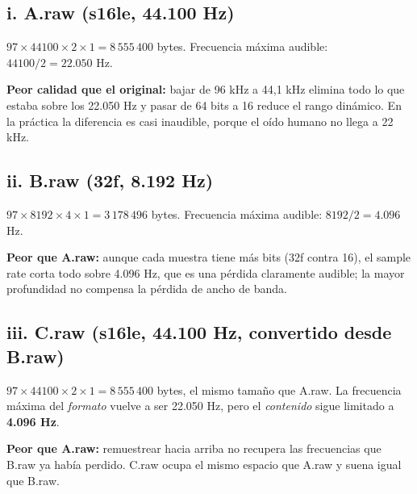 \documentclass[12pt, a4paper]{article}
\begin{document}
\subsection{i. A.raw (s16le, 44.100 Hz)}

$97 \times 44100 \times 2 \times 1 = 8\,555\,400$ bytes. Frecuencia máxima audible: $44100 / 2 = 22.050$ Hz.

\textbf{Peor calidad que el original:} bajar de 96 kHz a 44,1 kHz elimina todo lo que estaba sobre los 22.050 Hz y pasar de 64 bits a 16 reduce el rango dinámico. En la práctica la diferencia es casi inaudible, porque el oído humano no llega a 22 kHz.

\subsection{ii. B.raw (32f, 8.192 Hz)}

$97 \times 8192 \times 4 \times 1 = 3\,178\,496$ bytes. Frecuencia máxima audible: $8192 / 2 = 4.096$ Hz.

\textbf{Peor que A.raw:} aunque cada muestra tiene más bits (32f contra 16), el sample rate corta todo sobre 4.096 Hz, que es una pérdida claramente audible; la mayor profundidad no compensa la pérdida de ancho de banda.

\subsection{iii. C.raw (s16le, 44.100 Hz, convertido desde B.raw)}

$97 \times 44100 \times 2 \times 1 = 8\,555\,400$ bytes, el mismo tamaño que A.raw. La frecuencia máxima del \emph{formato} vuelve a ser 22.050 Hz, pero el \emph{contenido} sigue limitado a \textbf{4.096 Hz}.

\textbf{Peor que A.raw:} remuestrear hacia arriba no recupera las frecuencias que B.raw ya había perdido. C.raw ocupa el mismo espacio que A.raw y suena igual que B.raw.
\end{document}
